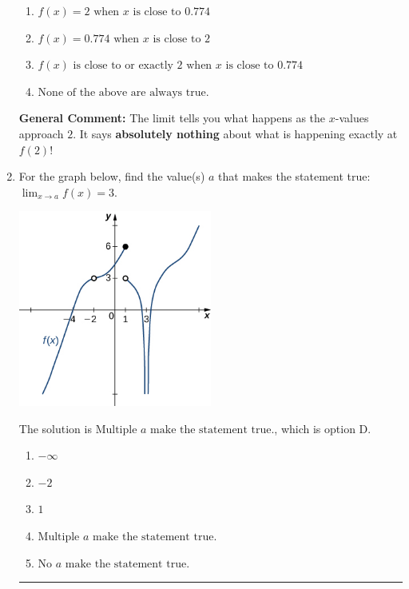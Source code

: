 \documentclass{extbook}[14pt]
\newcommand{\litem}[1]{\item #1

\rule{\textwidth}{0.4pt}}
\begin{document}
\begin{enumerate}
{\begin{enumerate}[label=\Alph*.]
\item \( f(x) = 2 \text{ when } x \text{ is close to } 0.774 \)


\item \( f(x) = 0.774 \text{ when } x \text{ is close to } 2 \)


\item \( f(x) \text{ is close to or exactly } 2 \text{ when } x \text{ is close to } 0.774 \)


\item \( \text{None of the above are always true.} \)


\end{enumerate}

\textbf{General Comment:} The limit tells you what happens as the $x$-values approach $2$. It says \textbf{absolutely nothing} about what is happening exactly at $f(2)$!
}
\litem{
For the graph below, find the value(s) $a$ that makes the statement true: $ \displaystyle \lim_{x \rightarrow a} f(x) = 3$.

\begin{center}
    \includegraphics[width=0.5\textwidth]{../Figures/evaluateLimitGraphicallyA.png}
\end{center}


The solution is \( \text{Multiple } a \text{ make the statement true}. \), which is option D.\begin{enumerate}[label=\Alph*.]
\item \( -\infty \)


\item \( -2 \)


\item \( 1 \)


\item \( \text{Multiple } a \text{ make the statement true}. \)


\item \( \text{No } a \text{ make the statement true}. \)



\end{enumerate}}
\end{enumerate}
\end{document}

